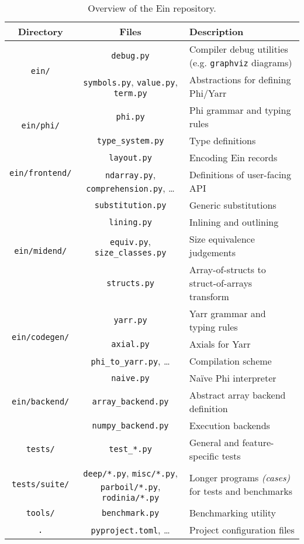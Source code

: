 \begin{table}[h]
    \centering
    \begin{tabular}{c|c|l}
        Directory & Files & Description \\ \hline \hline
        \multirow{2}{*}{\texttt{ein/}} 
        & \texttt{debug.py} & Compiler debug utilities (e.g. \texttt{graphviz} diagrams) \\
        & \texttt{symbols.py}, \texttt{value.py}, \texttt{term.py} & Abstractions for defining Phi/Yarr \\ \hline
        \multirow{2}{*}{\texttt{ein/phi/}} & \texttt{phi.py} & Phi grammar and typing rules \\ 
        & \texttt{type\_system.py} & Type definitions \\ \hline
        \multirow{2}{*}{\texttt{ein/frontend/}} & \texttt{layout.py} & Encoding Ein records \\ 
        & \texttt{ndarray.py}, \texttt{comprehension.py}, \dots & Definitions of user-facing API \\ \hline
       \multirow{4}{*}{\texttt{ein/midend/}}       
        & \texttt{substitution.py} & Generic substitutions \\ 
        & \texttt{lining.py} & Inlining and outlining \\ 
        & \texttt{equiv.py}, \texttt{size\_classes.py} & Size equivalence judgements \\ 
        & \texttt{structs.py} & Array-of-structs to struct-of-arrays transform \\ \hline
       \multirow{3}{*}{\texttt{ein/codegen/}}       
        & \texttt{yarr.py} & Yarr grammar and typing rules \\ 
        & \texttt{axial.py} & Axials for Yarr \\ 
        & \texttt{phi\_to\_yarr.py}, \dots & Compilation scheme \\ \hline
       \multirow{3}{*}{\texttt{ein/backend/}}       
        & \texttt{naive.py} & Na\"ive Phi interpreter \\ 
        & \texttt{array\_backend.py} & Abstract array backend definition \\
        & \texttt{numpy\_backend.py} & Execution backends \\ \hline
       \texttt{tests/}       
        & \texttt{test\_*.py} & General and feature-specific tests \\ \hline 
       \texttt{tests/suite/}       
        & \makecell{\texttt{deep/*.py}, \texttt{misc/*.py}, \\ \texttt{parboil/*.py}, \texttt{rodinia/*.py}} & Longer programs \textit{(cases)} for tests and benchmarks \\ \hline 
       \texttt{tools/}
        & \texttt{benchmark.py} & Benchmarking utility \\ \hline 
        \texttt{.} & \texttt{pyproject.toml}, \dots & Project configuration files
    \end{tabular}
    \caption{Overview of the Ein repository.}
    \label{tab:repository}
\end{table}
